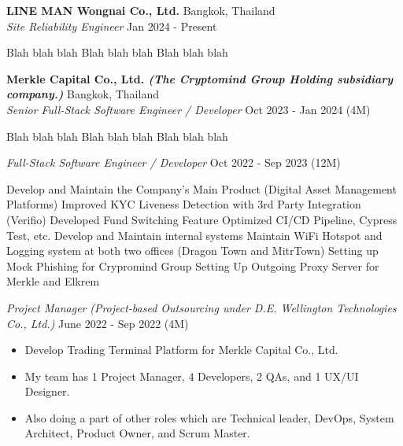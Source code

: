 \textbf{LINE MAN Wongnai Co., Ltd.} \hfill Bangkok, Thailand\\
\textit{Site Reliability Engineer} \hfill Jan 2024 - Present\\
\begin{outline}
	\1 Blah blah blah
	\1 Blah blah blah
	\1 Blah blah blah
\end{outline}
\vspace{-1mm}
\textbf{Merkle Capital Co., Ltd. \textit{\tiny{(The Cryptomind Group Holding subsidiary company.)}}} \hfill Bangkok, Thailand\\
\textit{Senior Full-Stack Software Engineer / Developer} \hfill Oct 2023 - Jan 2024 (4M)\\
\vspace{-1mm}
\begin{outline}
	\1 Blah blah blah
	\1 Blah blah blah
	\1 Blah blah blah
\end{outline}
\vspace{-1mm}
\textit{Full-Stack Software Engineer / Developer} \hfill Oct 2022 - Sep 2023 (12M)\\
\vspace{-1mm}
\begin{outline}
	\1 Develop and Maintain the Company's Main Product (Digital Asset Management Platforms)
		\2 Improved KYC Liveness Detection with 3rd Party Integration (Verifio)
		\2 Developed Fund Switching Feature
		\2 Optimized CI/CD Pipeline, Cypress Test, etc.
	\1 Develop and Maintain internal systems
		\2 Maintain WiFi Hotspot and Logging system at both two offices (Dragon Town and MitrTown)
		\2 Setting up Mock Phishing for Crypromind Group
		\2 Setting Up Outgoing Proxy Server for Merkle and Elkrem
\end{outline}
\vspace{-1mm}
\textit{Project Manager} \textit{\tiny (Project-based Outsourcing under D.E. Wellington Technologies Co., Ltd.)} \hfill June 2022 - Sep 2022 (4M)\\
\vspace{-1mm}
\begin{itemize}
	\item Develop Trading Terminal Platform for Merkle Capital Co., Ltd.
	\item My team has 1 Project Manager, 4 Developers, 2 QAs, and 1 UX/UI Designer.
	\item Also doing a part of other roles which are Technical leader, DevOps, System Architect, Product Owner, and Scrum Master.
\end{itemize}
\vspace{-1mm}
